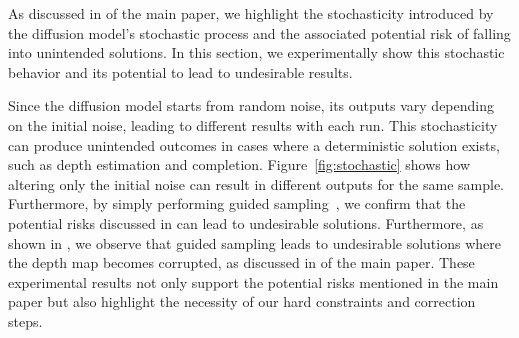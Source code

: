 As discussed in  of the main paper, we highlight the stochasticity introduced by the diffusion model's stochastic process and the associated potential risk of falling into unintended solutions.
In this section, we experimentally show this stochastic behavior and its potential to lead to undesirable results.

Since the diffusion model starts from random noise, its outputs vary depending on the initial noise, leading to different results with each run. 
This stochasticity can produce unintended outcomes in cases where a deterministic solution exists, such as depth estimation and completion. 
Figure~\ref{fig:stochastic} shows how altering only the initial noise can result in different outputs for the same sample.
Furthermore, by simply performing guided sampling~\cite{chung2023dps}, we confirm that the potential risks discussed in  can lead to undesirable solutions.
Furthermore, as shown in , we observe that guided sampling leads to undesirable solutions where the depth map becomes corrupted, as discussed in  of the main paper.
These experimental results not only support the potential risks mentioned in the main paper but also highlight the necessity of our hard constraints and correction steps.


